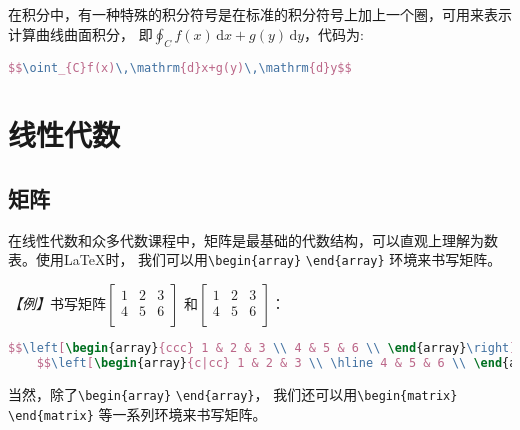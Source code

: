 在积分中，有一种特殊的积分符号是在标准的积分符号上加上一个圈，可用来表示计算曲线曲面积分，
即$\oint_{C}f(x)\,\mathrm{d}x+g(y)\,\mathrm{d}y$，代码为:
\begin{lstlisting}[language=TeX]
    $$\oint_{C}f(x)\,\mathrm{d}x+g(y)\,\mathrm{d}y$$
\end{lstlisting}

\section{线性代数}
\subsection{矩阵}
在线性代数和众多代数课程中，矩阵是最基础的代数结构，可以直观上理解为数表。使用LaTeX时，
我们可以用\texttt{\textbackslash{}begin\{array\}} \texttt{\textbackslash{}end\{array\}}
环境来书写矩阵。

\emph{【例】}书写矩阵$\left[\begin{array}{ccc} 1 & 2 & 3 \\ 4 & 5 & 6 \\ \end{array}\right]$
和$\left[\begin{array}{c|cc} 1 & 2 & 3 \\ \hline 4 & 5 & 6 \\ \end{array}\right]$：
\begin{lstlisting}[language=TeX]
    $$\left[\begin{array}{ccc} 1 & 2 & 3 \\ 4 & 5 & 6 \\ \end{array}\right]$$
    $$\left[\begin{array}{c|cc} 1 & 2 & 3 \\ \hline 4 & 5 & 6 \\ \end{array}\right]$$
\end{lstlisting}

当然，除了\texttt{\textbackslash{}begin\{array\}} \texttt{\textbackslash{}end\{array\}}，
我们还可以用\texttt{\textbackslash{}begin\{matrix\}} \texttt{\textbackslash{}end\{matrix\}}
等一系列环境来书写矩阵。

